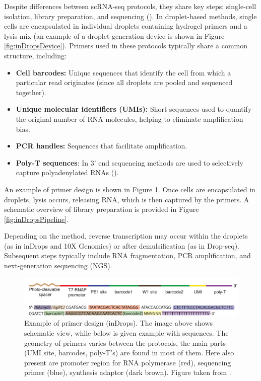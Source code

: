 Despite differences between scRNA-seq protocols, they share key steps:
single-cell isolation, library preparation, and sequencing (\cite{Andrews2018}).
In droplet-based methods, single cells are encapsulated in individual droplets containing hydrogel primers
and a lysis mix (an example of a droplet generation device is shown in Figure \ref{fig:inDropsDevice}).
Primers used in these protocols typically share a common structure, including:

\begin{itemize}
  \item \textbf{Cell barcodes:} Unique sequences that identify the cell from which a particular read originates (since all droplets are pooled and sequenced together).
  \item \textbf{Unique molecular identifiers (UMIs):} Short sequences used to quantify the original number of RNA molecules, helping to eliminate amplification bias.
  \item \textbf{PCR handles:} Sequences that facilitate amplification.
  \item \textbf{Poly-T sequences}: In 3' end sequencing methods are used to selectively capture polyadenylated RNAs (\cite{Zhang2019}).
\end{itemize}
An example of primer design is shown in Figure \ref{fig:inDropsPrimer}.
Once cells are encapsulated in droplets, lysis occurs, releasing RNA, which is then captured by the primers.
A schematic overview of library preparation is provided in Figure \ref{fig:inDropsPipeline}.

Depending on the method, reverse transcription may occur within the droplets
(as in inDrops and 10X Genomics) or after demulsification (as in Drop-seq).
Subsequent steps typically include RNA fragmentation, PCR amplification, and next-generation sequencing (NGS).

\begin{figure}
  \centering
  \includegraphics[width=\linewidth]{images/primer.png}
  \caption{Example of primer design (inDrops).
  The image above shows schematic view, while below is given example with sequences.
  The geometry of primers varies between the protocols, the main parts (UMI site, barcodes, poly-T's)
  are found in most of them.
  Here also present are promoter region for RNA polymerase (red), sequencing primer (blue), synthesis adaptor (dark brown).
  Figure taken from \textcite{Klein2015}.}
  \label{fig:inDropsPrimer}
\end{figure}


